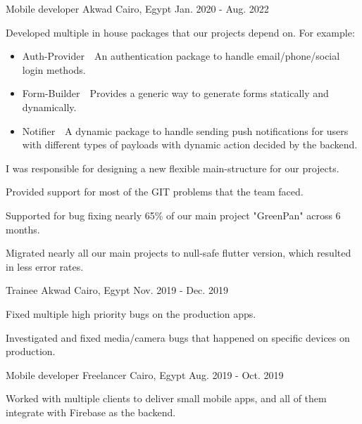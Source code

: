 \begin{cventries}
  \cventry
    {Mobile developer} %
    {Akwad} %
    {Cairo, Egypt} %
    {Jan. 2020 - Aug. 2022} %
    {
      \begin{cvitems} %
        \item {Developed multiple in house packages that our projects depend on. For example:}
        \begin{itemize}
          \item {Auth-Provider~\rightarrow~An authentication package to handle email/phone/social login methods.}
          \item {Form-Builder~\rightarrow~Provides a generic way to generate forms statically and dynamically.}
          \item {Notifier~\rightarrow~A dynamic package to handle sending push notifications for users with different types of payloads with dynamic action decided by the backend.}
        \end{itemize}
        \item {I was responsible for designing a new flexible main-structure for our projects.}
        \item {Provided support for most of the GIT problems that the team faced.}
        \item {Supported for bug fixing nearly 65\% of our main project "GreenPan" across 6 months.}
        \item {Migrated nearly all our main projects to null-safe flutter version, which resulted in less error rates.}
      \end{cvitems}
    }

  \cventry
    {Trainee} %
    {Akwad} %
    {Cairo, Egypt} %
    {Nov. 2019 - Dec. 2019} %
    {
      \begin{cvitems}
        \item {Fixed multiple high priority bugs on the production apps.}
        \item {Investigated and fixed media/camera bugs that happened on specific devices on production.}
      \end{cvitems}
    }

  \cventry
    {Mobile developer} %
    {Freelancer} %
    {Cairo, Egypt} %
    {Aug. 2019 - Oct. 2019} %
    {
      \begin{cvitems}
        Worked with multiple clients to deliver small mobile apps, and all of them integrate with Firebase as the backend.
      \end{cvitems}
    }

\end{cventries}
  